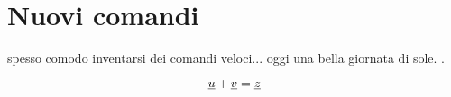 \documentclass{article}
\begin{document}
\section{Nuovi comandi}

\EEE spesso comodo inventarsi dei comandi veloci... oggi \eee una bella giornata di sole. \eee.

\[
\underline{u} + \underline{v} = \underline{z}
\]
\end{document}
